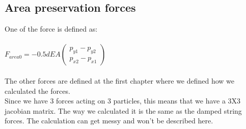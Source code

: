 \documentclass[10pt,a4paper]{report}
\begin{document}
\subsection*{Area preservation forces}
One of the force is defined as:\\\\
$
F_{area0}=-0.5dEA\begin{pmatrix}
p_{y1}-p_{y2}\\
p_{x2}-p_{x1}
\end{pmatrix}
$\\\\
The other forces are defined at the first chapter where we defined how we calculated the forces.\\
Since we have 3 forces acting on 3 particles, this means that we have a 3X3 jacobian matrix. The way we calculated it is the same as the damped string forces. The calculation can get messy and won't be described here.
\end{document}
